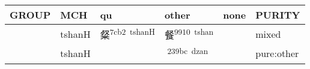 \documentclass[14pt,a4paper]{scrartcl}
\begin{document}
\begin{longtable}[c]{@{}llllll@{}}
\toprule
\begin{minipage}[b]{0.14\columnwidth}\raggedright\strut
GROUP
\strut\end{minipage} &
\begin{minipage}[b]{0.14\columnwidth}\raggedright\strut
MCH
\strut\end{minipage} &
\begin{minipage}[b]{0.14\columnwidth}\raggedright\strut
qu
\strut\end{minipage} &
\begin{minipage}[b]{0.14\columnwidth}\raggedright\strut
other
\strut\end{minipage} &
\begin{minipage}[b]{0.14\columnwidth}\raggedright\strut
none
\strut\end{minipage} &
\begin{minipage}[b]{0.14\columnwidth}\raggedright\strut
PURITY
\strut\end{minipage}\tabularnewline
\midrule
\endhead
\begin{minipage}[t]{0.14\columnwidth}\raggedright\strut
𣦼
\strut\end{minipage} &
\begin{minipage}[t]{0.14\columnwidth}\raggedright\strut
tshanH
\strut\end{minipage} &
\begin{minipage}[t]{0.14\columnwidth}\raggedright\strut
粲\textsuperscript{7cb2~tshanH}
\strut\end{minipage} &
\begin{minipage}[t]{0.14\columnwidth}\raggedright\strut
餐\textsuperscript{9910~tshan}
\strut\end{minipage} &
\begin{minipage}[t]{0.14\columnwidth}\raggedright\strut
\strut\end{minipage} &
\begin{minipage}[t]{0.14\columnwidth}\raggedright\strut
mixed
\strut\end{minipage}\tabularnewline
\begin{minipage}[t]{0.14\columnwidth}\raggedright\strut
𣦵
\strut\end{minipage} &
\begin{minipage}[t]{0.14\columnwidth}\raggedright\strut
tshanH
\strut\end{minipage} &
\begin{minipage}[t]{0.14\columnwidth}\raggedright\strut
\strut\end{minipage} &
\begin{minipage}[t]{0.14\columnwidth}\raggedright\strut
𣦼\textsuperscript{239bc~dzan}
\strut\end{minipage} &
\begin{minipage}[t]{0.14\columnwidth}\raggedright\strut
\strut\end{minipage} &
\begin{minipage}[t]{0.14\columnwidth}\raggedright\strut
pure:other
\strut\end{minipage}\tabularnewline
\bottomrule
\end{longtable}
\end{document}
